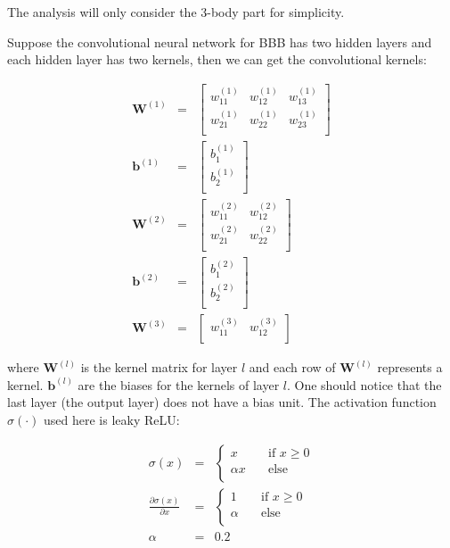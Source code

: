 \documentclass{article}
\begin{document}
\noindent The analysis will only consider the 3-body part for simplicity.

Suppose the convolutional neural network for BBB has two hidden layers and each hidden 
layer has two kernels, then we can get the convolutional kernels:

\begin{eqnarray}
\mathbf{W}^{(1)} & = & \left[\begin{array}{ccc}
	w^{(1)}_{11} & w^{(1)}_{12} & w^{(1)}_{13} \\
	w^{(1)}_{21} & w^{(1)}_{22} & w^{(1)}_{23} \\
\end{array}
\right] \\
\mathbf{b}^{(1)} & = & \left[\begin{array}{c}
	b^{(1)}_{1} \\
	b^{(1)}_{2} \\
\end{array}
\right] \\
\mathbf{W}^{(2)} & = & \left[\begin{array}{cc}
	w^{(2)}_{11} & w^{(2)}_{12} \\
	w^{(2)}_{21} & w^{(2)}_{22} \\
\end{array}
\right] \\
\mathbf{b}^{(2)} & = & \left[\begin{array}{c}
	b^{(2)}_{1} \\
	b^{(2)}_{2} \\
\end{array}
\right] \\
\mathbf{W}^{(3)} & = & \left[\begin{array}{cc}
	w^{(3)}_{11} & w^{(3)}_{12} \\
\end{array}
\right]
\end{eqnarray}

\noindent where $\mathbf{W}^{(l)}$ is the kernel matrix for layer $l$ and each row of  
$\mathbf{W}^{(l)}$ represents a kernel. $\mathbf{b}^{(l)}$ are the biases for the kernels of 
layer $l$. One should notice that the last layer (the output layer) does not have a bias unit.
The activation function $\sigma(\cdot)$ used here is leaky ReLU:

\begin{eqnarray}
\sigma(x) & = & \begin{cases}
	x & \quad \text{if } x \geq 0 \\
	\alpha x & \quad \text{else} \\
\end{cases} \\
\frac{\partial{\sigma(x)}}{\partial{x}} & = & \begin{cases}
	1 & \quad \text{if } x \geq 0 \\
	\alpha & \quad \text{else} \\
\end{cases} \\
\alpha & = & 0.2
\end{eqnarray}
\end{document}

